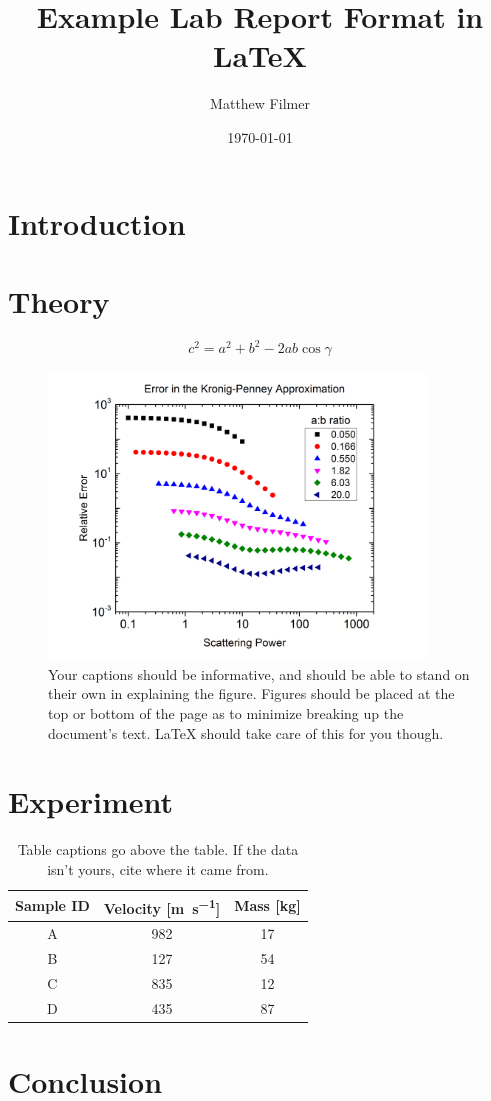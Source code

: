 \documentclass{microereport}
\author{Matthew Filmer}
\date{\today}
\title{Example Lab Report Format in \LaTeX{}}
\begin{document}
\maketitle
\begin{abstract}
	\lipsum[1]
\end{abstract}

\section{Introduction}
\lipsum[2-4]

\section{Theory}
\lipsum[5]
\begin{equation}
	c^2 = a^2 + b^2 - 2ab\cos\gamma
	\label{equ:lawOfCosines}
\end{equation}
\lipsum[6]
\begin{figure}
	\centering
	\includegraphics[width=10cm]{error}
	\caption{Your captions should be informative, and should be able to stand on their own in explaining the figure. Figures should be placed at the top or bottom of the page as to minimize breaking up the document's text. \LaTeX{} should take care of this for you though.}
	\label{fig:KPerror}
\end{figure}
\lipsum[7]

\section{Experiment}
\lipsum[8-10]
\begin{table}
	\centering
	\caption{Table captions go above the table. If the data isn't yours, cite where it came from. \cite{sample2}}
	\label{tab:table}
	\begin{tabular}{ccc}
		\toprule
		Sample ID	& Velocity [\si{\meter\per\second}]	& Mass [\si{\kilo\gram}]\\
		\midrule
		A			& 982	& 17\\
		B			& 127	& 54\\
		C			& 835	& 12\\
		D			& 435	& 87\\
		\bottomrule
	\end{tabular}
\end{table}
\lipsum[11-12]

\section{Conclusion}
\lipsum[13-14]

\nocite{sample1,sample2}


\end{document}
